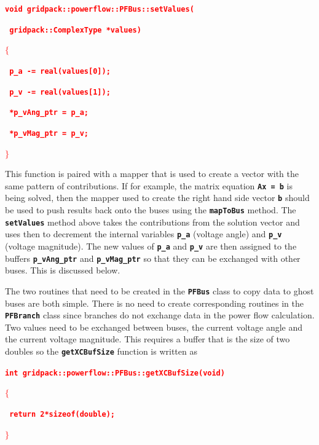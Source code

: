 \documentclass[12pt]{report} %
\begin{document}
\textcolor{red}{\texttt{\textbf{void gridpack::powerflow::PFBus::setValues(}}}

\textcolor{red}{\texttt{\textbf{    gridpack::ComplexType *values)}}}

\textcolor{red}{\texttt{\textbf{$\boldsymbol{\mathrm{\{}}$}}}

\textcolor{red}{\texttt{\textbf{  p\_a -= real(values[0]);}}}

\textcolor{red}{\texttt{\textbf{  p\_v -= real(values[1]);}}}

\textcolor{red}{\texttt{\textbf{  *p\_vAng\_ptr = p\_a;}}}

\textcolor{red}{\texttt{\textbf{  *p\_vMag\_ptr = p\_v;}}}

\textcolor{red}{\texttt{\textbf{$\boldsymbol{\mathrm{\}}}$}}}

This function is paired with a mapper that is used to create a vector with the same pattern of contributions. If for example, the matrix equation \texttt{\textbf{Ax = b}} is being solved, then the mapper used to create the right hand side vector \texttt{\textbf{b}} should be used to push results back onto the buses using the \texttt{\textbf{mapToBus}} method. The \texttt{\textbf{setValues}} method above takes the contributions from the solution vector and uses then to decrement the internal variables \texttt{\textbf{p\_a}} (voltage angle) and \texttt{\textbf{p\_v}} (voltage magnitude). The new values of \texttt{\textbf{p\_a}} and \texttt{\textbf{p\_v}} are then assigned to the buffers \texttt{\textbf{p\_vAng\_ptr}} and \texttt{\textbf{p\_vMag\_ptr}} so that they can be exchanged with other buses. This is discussed below.

The two routines that need to be created in the \texttt{\textbf{PFBus}} class to copy data to ghost buses are both simple. There is no need to create corresponding routines in the \texttt{\textbf{PFBranch}} class since branches do not exchange data in the power flow calculation. Two values need to be exchanged between buses, the current voltage angle and the current voltage magnitude. This requires a buffer that is the size of two doubles so the \texttt{\textbf{getXCBufSize}} function is written as

\textcolor{red}{\texttt{\textbf{int gridpack::powerflow::PFBus::getXCBufSize(void)}}}

\textcolor{red}{\texttt{\textbf{$\boldsymbol{\mathrm{\{}}$}}}

\textcolor{red}{\texttt{\textbf{  return 2*sizeof(double);}}}

\textcolor{red}{\texttt{\textbf{$\boldsymbol{\mathrm{\}}}$}}}
\end{document}

